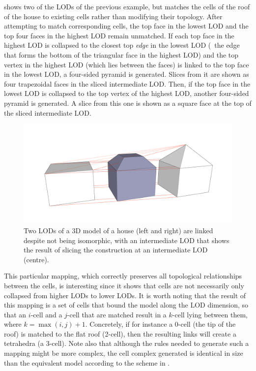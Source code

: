  shows two of the LODs of the previous example, but matches the cells of the roof of the house to existing cells rather than modifying their topology.
After attempting to match corresponding cells, the top face in the lowest LOD and the top four faces in the highest LOD remain unmatched.
If each top face in the highest LOD is collapsed to the closest top \emph{edge} in the lowest LOD (\ie\ the edge that forms the bottom of the triangular face in the highest LOD) and the top vertex in the highest LOD (which lies between the faces) is linked to the top face in the lowest LOD, a four-sided pyramid is generated.
Slices from it are shown as four trapezoidal faces in the sliced intermediate LOD.\@
Then, if the top face in the lowest LOD is collapsed to the top vertex of the highest LOD, another four-sided pyramid is generated.
A slice from this one is shown as a square face at the top of the sliced intermediate LOD.\@
\begin{figure}[tb]
   \centering
   \includegraphics[width=\linewidth]{figs/link2}
   \caption[Linking by matching cells]{Two LODs of a 3D model of a house (left and right) are linked despite not being isomorphic, with an intermediate LOD that shows the result of slicing the construction at an intermediate LOD (centre).}
\label{fig:link2}
\end{figure}

This particular mapping, which correctly preserves all topological relationships between the cells, is interesting since it shows that cells are not necessarily only collapsed from higher LODs to lower LODs.
It is worth noting that the result of this mapping is a set of cells that bound the model along the LOD dimension, so that an $i$-cell and a $j$-cell that are matched result in a $k$-cell lying between them, where $k = \max(i, j)+1$.
Concretely, if for instance a 0-cell (the tip of the roof) is matched to the flat roof (2-cell), then the resulting links will create a tetrahedra (a 3-cell).
Note also that although the rules needed to generate such a mapping might be more complex, the cell complex generated is identical in size than the equivalent model according to the scheme in .

